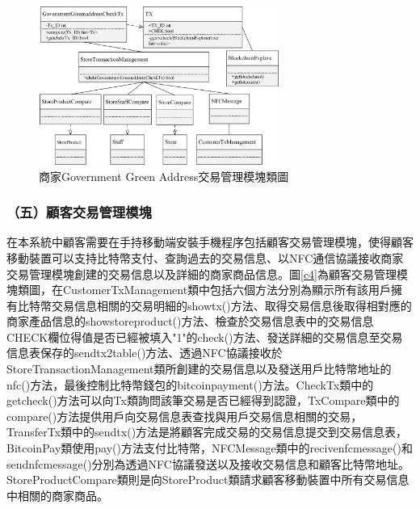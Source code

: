 	

	\begin{figure}[!htbp]
		\centering
		\includegraphics[width = 0.7\textwidth]{c7.jpg}
		\caption{商家Government Green Address交易管理模塊類圖}\label{c7}
	\end{figure}



\subsubsection{（五）顧客交易管理模塊}
在本系統中顧客需要在手持移動端安裝手機程序包括顧客交易管理模塊，使得顧客移動裝置可以支持比特幣支付、查詢過去的交易信息、以NFC通信協議接收商家交易管理模塊創建的交易信息以及詳細的商家商品信息。圖\ref{c4}為顧客交易管理模塊類圖，在CustomerTxManagement類中包括六個方法分別為顯示所有該用戶擁有比特幣交易信息相關的交易明細的showtx()方法、取得交易信息後取得相對應的商家產品信息的showstoreproduct()方法、檢查於交易信息表中的交易信息CHECK欄位得值是否已經被填入"1"的check()方法、發送詳細的交易信息至交易信息表保存的sendtx2table()方法、透過NFC協議接收於StoreTransactionManagement類所創建的交易信息以及發送用戶比特幣地址的nfc()方法，最後控制比特幣錢包的bitcoinpayment()方法。CheckTx類中的getcheck()方法可以向Tx類詢問該筆交易是否已經得到認證，TxCompare類中的compare()方法提供用戶向交易信息表查找與用戶交易信息相關的交易，TransferTx類中的sendtx()方法是將顧客完成交易的交易信息提交到交易信息表，BitcoinPay類使用pay()方法支付比特幣，NFCMessage類中的recivenfcmessage()和sendnfcmessage()分別為透過NFC協議發送以及接收交易信息和顧客比特幣地址。StoreProductCompare類則是向StoreProduct類請求顧客移動裝置中所有交易信息中相關的商家商品。

